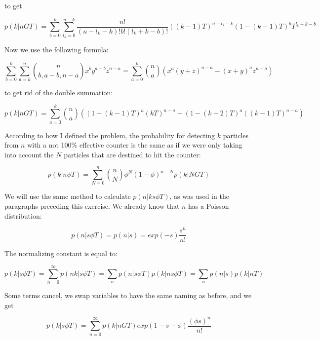 \documentclass{../note}
\begin{document}
\begin{solution}
to get

\begin{equation*}
p(k | n G T) = \sum_{b=0}^{k} \sum_{l_k=0}^{n-k} \frac{n!}{(n-l_k-k)!b!(l_k+k-b)!} ((k-1)T)^{n-l_k-k} (1-(k-1)T)^b T^{l_k+k-b}
\end{equation*}

Now we use the following formula:

\begin{equation*}
\sum_{b=0}^{k} \sum_{a=k}^{n} \binom{n}{b, a-b, n-a} x^b y^{a-b} z^{n-a} = \sum_{a=0}^{k} \binom{n}{a} \left(x^a(y+z)^{n-a} - (x + y)^a z^{n-a}\right)
\end{equation*}

to get rid of the double summation:

\begin{equation*}
p(k | n G T) = \sum_{a=0}^{k} \binom{n}{a} \left((1 - (k-1)T)^a(kT)^{n-a} - (1-(k-2)T)^a((k-1)T)^{n-a}\right)
\end{equation*}

According to how I defined the problem, the probability for detecting $k$ particles from $n$ with a not 100\% effective counter is the same as if we were only taking into account the $N$ particles that are destined to hit the counter:

\begin{equation*}
p(k | n \phi T) = \sum_{N=0}^{n} \binom{n}{N} \phi^N (1-\phi)^ {n - N} p(k | N G T)
\end{equation*}

We will use the same method to calculate $p(n | k s \phi T)$, as was used in the paragraphs preceding this exercise. We already know that $n$ has a Poisson distribution:

\begin{equation*}
p(n|s \phi T) = p(n|s) = exp(-s)\frac{s^n}{n!}
\end{equation*}

The normalizing constant is equal to:

\begin{equation*}
p(k | s \phi T) = \sum_{n=0}^{\infty} p(nk | s \phi T) = \sum_{n} p(n | s \phi T) p(k | n s \phi T) = \sum_{n} p(n | s) p(k | n T)
\end{equation*}

Some terms cancel, we swap variables to have the same naming as before, and we get

\begin{equation*}
p(k | s \phi T) = \sum_{n=0}^{\infty} p(k|nGT) exp(1 - s - \phi) \frac{(\phi s)^n}{n!}
\end{equation*}


\end{solution}
\end{document}

